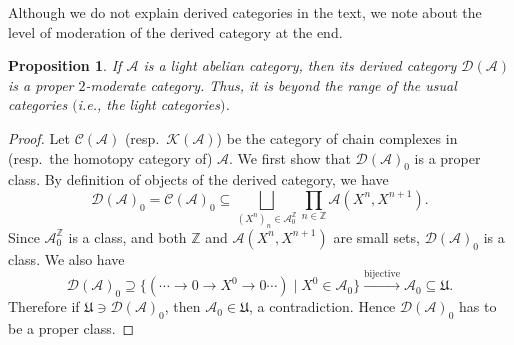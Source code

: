 \documentclass{surv-l}
\numberwithin{equation}{chapter}
\numberwithin{figure}{chapter}
\theoremstyle{plain}
\newtheorem{prp}[thm]{Proposition}
\theoremstyle{definition}
\theoremstyle{remark}
\begin{document}
Although we do not explain derived categories in the text,
we note about the level of moderation of the derived category at the end.

\begin{prp}
If $\mathcal{A}$ is a light abelian category,
then its derived category ${\mathcal{D}}(\mathcal{A})$ is a proper $2$-moderate category.
Thus, it is beyond the range of the usual categories
$($i.e., the light categories$)$.
\end{prp}

\begin{proof}
Let ${\mathcal{C}}(\mathcal{A})$ (resp.\ $\mathcal{K}(\mathcal{A})$) be the category of chain complexes
in (resp.\ the homotopy category of) $\mathcal{A}$.
We first show that ${\mathcal{D}}(\mathcal{A})_0$ is a proper class.
By definition of objects of the derived category, we have
\[
{\mathcal{D}}(\mathcal{A})_0 = {\mathcal{C}}(\mathcal{A})_0 \subseteq \bigsqcup_{(X^n)_n \in \mathcal{A}_0^\mathbb{Z}} \prod_{n \in \mathbb{Z}} \mathcal{A}(X^n, X^{n+1}).
\]
Since $\mathcal{A}_0^\mathbb{Z}$ is a class, and both $\mathbb{Z}$ and $\mathcal{A}(X^n, X^{n+1})$
are small sets, ${\mathcal{D}}(\mathcal{A})_0$ is a class.
We also have
\[
{\mathcal{D}}(\mathcal{A})_0 \supseteq \{ (\cdots \to 0 \to X^0 \to 0\cdots) \mid X^0 \in \mathcal{A}_0\}
\xrightarrow{\text{bijective}} \mathcal{A}_0 \subseteq \mathfrak{U}.
\]
Therefore if $\mathfrak{U} \ni {\mathcal{D}}(\mathcal{A})_0$, then $\mathcal{A}_0 \in \mathfrak{U}$, a contradiction.
Hence ${\mathcal{D}}(\mathcal{A})_0$ has to be a proper class.


\end{proof}
\end{document}
